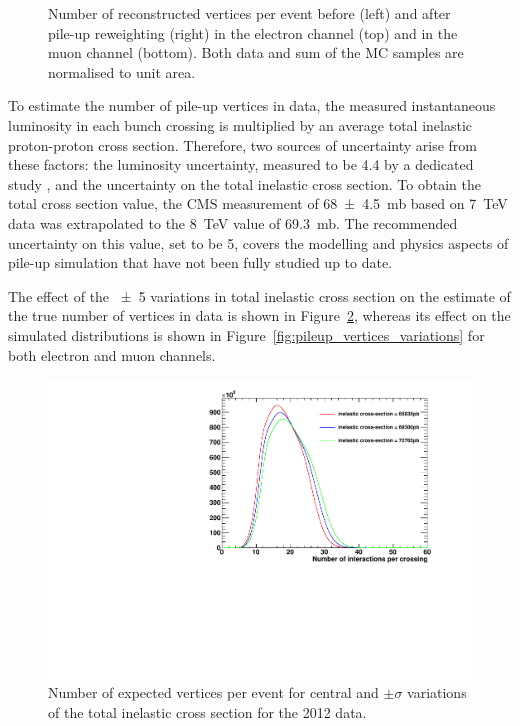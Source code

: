 \begin{figure}[!htpb]
	\caption{\label{fig:pileup_vertices}
    Number of reconstructed vertices per event before (left) and after pile-up reweighting (right) in the electron
    channel (top) and in the muon channel (bottom). Both data and sum of the MC samples are normalised to unit area.}
\end{figure}

To estimate the number of pile-up vertices in data, the measured instantaneous luminosity in each bunch crossing is
multiplied by an average total inelastic proton-proton cross section. Therefore, two sources of uncertainty arise from
these factors: the luminosity uncertainty, measured to be \SI{4.4}{\pc} by a dedicated study \autocite{CMS_lumi_2012},
and the uncertainty on the total inelastic cross section. To obtain the total cross section value, the CMS measurement
of \SI{68\pm4.5}{\milli\barn} based on \SI{7}{\TeV} data \autocite{CMS_total_inelastic_7TeV} was extrapolated to the
\SI{8}{\TeV} value of \SI{69.3}{\milli\barn}. The recommended uncertainty on this value, set to be \SI{5}{\pc}, covers
the modelling and physics aspects of pile-up simulation that have not been fully studied up to date.


The effect of the \SI{\pm5}{\pc} variations in total inelastic cross section on the estimate of the true number of
vertices in data is shown in Figure~\ref{fig:pileup_truth}, whereas its effect on the simulated distributions is shown
in Figure~\ref{fig:pileup_vertices_variations} for both electron and muon channels.

 \begin{figure}[htbp]
   	\centering
    \includegraphics[width=\textwidth]{vertices/PileUp_2012_truth_data.pdf}
    \caption{Number of expected vertices per event for central and $\pm \sigma$ variations of the total inelastic cross
    section for the 2012 data.}
    \label{fig:pileup_truth}
 \end{figure}

